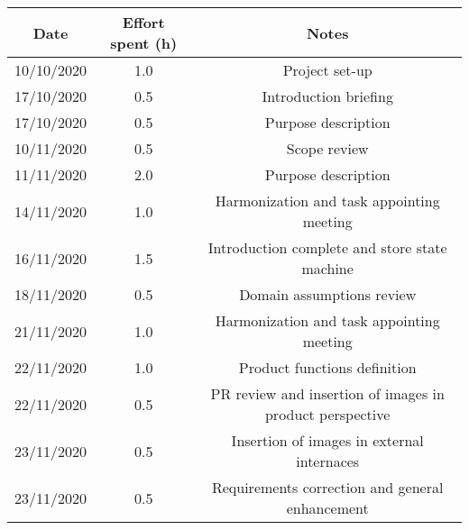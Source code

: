 \documentclass[../../main.tex]{subfiles}
\begin{document}
    \begin{center}
        \begin{tabular}{|c| |c| |c|} 
            \hline
            Date & Effort spent (h) & Notes\\ [0.5ex] 
            \hline\hline
            10/10/2020 & 1.0 & Project set-up\\ 
            17/10/2020 & 0.5 & Introduction briefing\\ 
            17/10/2020 & 0.5 & Purpose description\\ 
            10/11/2020 & 0.5 & Scope review\\
            11/11/2020 & 2.0 & Purpose description\\
            14/11/2020 & 1.0 & Harmonization and task appointing meeting\\
            16/11/2020 & 1.5 & Introduction complete and store state machine\\
            18/11/2020 & 0.5 & Domain assumptions review\\
            21/11/2020 & 1.0 & Harmonization and task appointing meeting\\
            22/11/2020 & 1.0 & Product functions definition\\
            22/11/2020 & 0.5 & PR review and insertion of images in product perspective\\
            23/11/2020 & 0.5 & Insertion of images in external internaces\\
            23/11/2020 & 0.5 & Requirements correction and general enhancement\\
            \hline
        \end{tabular}
    \end{center}
\end{document}
